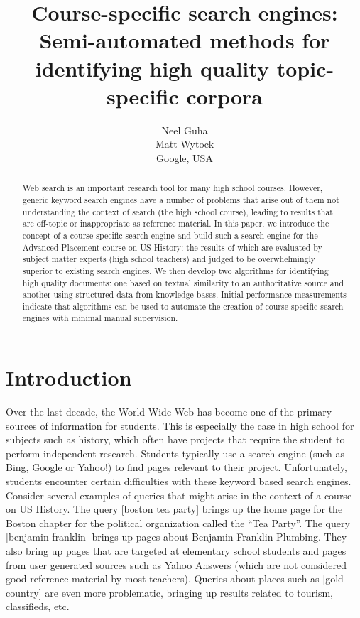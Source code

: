 \documentclass[pdfpagelabels=false,plainpages=true]{acm_proc_article-sp}
\begin{document}
\title{Course-specific search engines: Semi-automated methods for identifying
  high quality topic-specific corpora} 

\author{
  \alignauthor
  Neel Guha \\
  \alignauthor
  Matt Wytock \\
  Google, USA
}

\maketitle
\begin{abstract}
Web search is an important research tool for many high school courses. However,
generic keyword search engines have a number of problems that arise out of them
not understanding the context of search (the high school course),
leading to results that are off-topic or inappropriate as reference material. In
this paper, we introduce the concept of a course-specific search 
engine and build such a search engine for the Advanced Placement course on US
History; the results of which are evaluated by subject matter experts (high
school teachers) and judged to be overwhelmingly superior to existing search engines. We
then develop two algorithms for identifying high quality documents: one 
based on textual similarity to an authoritative source and another using structured
data from knowledge bases. Initial performance measurements indicate that
algorithms can be used to automate the creation of course-specific search
engines with minimal manual supervision.
\end{abstract}

\section{Introduction}

Over the last decade, the World Wide Web has become one of the primary sources
of information for students. This is especially the case in high school for
subjects such as history, which often have projects that require the student to
perform independent research. Students typically use a search engine (such as
Bing, Google or Yahoo!) to find pages relevant to their project. Unfortunately,
students encounter certain difficulties with these keyword based search engines.
Consider several examples of queries that might arise in the context of a course
on US History. The query [boston tea party] brings up the home page for the
Boston chapter for the political organization called the ``Tea Party''. The
query [benjamin franklin] brings up pages about Benjamin Franklin Plumbing. They
also bring up pages that are targeted at elementary school students and pages
from user generated sources such as Yahoo Answers  (which are not considered
good reference material by most teachers). Queries about places such as [gold
  country] are even more problematic, bringing up results related to tourism,
classifieds, etc.  
\end{document}

